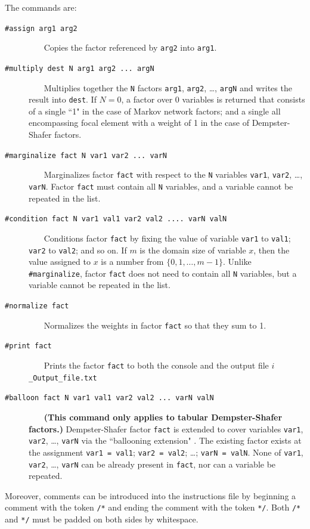 \documentclass{article}
\begin{document}
The commands are:
\begin{description}
\item[\texttt{\#assign arg1 arg2}] ~~~ Copies the factor referenced by \texttt{arg2} into \texttt{arg1}. 
\item[\texttt{\#multiply dest N arg1 arg2 ... argN}] ~~~ Multiplies together the \texttt{N} factors \texttt{arg1}, \texttt{arg2}, \dots, \texttt{argN} and writes the result into \texttt{dest}. If \(N = 0\), a factor over 0 variables is returned that consists of a single ``1" in the case of Markov network factors; and a single all encompassing focal element with a weight of 1 in the case of Dempster-Shafer factors. 
\item[\texttt{\#marginalize fact N var1 var2 ... varN}] ~~~ Marginalizes factor \texttt{fact} with respect to the \texttt{N} variables \texttt{var1}, \texttt{var2}, \dots, \texttt{varN}. Factor \texttt{fact} must contain all \texttt{N} variables, and a variable cannot be repeated in the list.
\item[\texttt{\#condition fact N var1 val1 var2 val2 .... varN valN}] ~~~ Conditions factor \texttt{fact} by fixing the value of variable \texttt{var1} to \texttt{val1}; \texttt{var2} to \texttt{val2}; and so on. If \(m\) is the domain size of variable \(x\), then the value assigned to \(x\) is a number from $\{0, 1, \dots, m-1\}$. Unlike \texttt{\#marginalize}, factor \texttt{fact} does not need to contain all \texttt{N} variables, but a variable cannot be repeated in the list.
\item[\texttt{\#normalize fact}] ~~~ Normalizes the weights in factor \texttt{fact} so that they sum to 1.
\item[\texttt{\#print fact}] ~~~ Prints the factor \texttt{fact} to both the console and the output file \texttt{$i$\_Output\_file.txt}
\item[\texttt{\#balloon fact N var1 val1 var2 val2 ... varN valN}] ~~~ \textbf{(This command only applies to tabular Dempster-Shafer factors.)} Dempster-Shafer factor \texttt{fact} is extended to cover variables \texttt{var1}, \texttt{var2}, \dots, \texttt{varN} via the ``ballooning extension" \cite{[Eastwood2015]}.  The existing factor exists at the assignment \texttt{var1 = val1}; \texttt{var2 = val2}; \dots; \texttt{varN = valN}. None of \texttt{var1}, \texttt{var2}, \dots, \texttt{varN} can be already present in \texttt{fact}, nor can a variable be repeated.
\end{description}

Moreover, comments can be introduced into the instructions file by beginning a comment with the token \texttt{/*} and ending the comment with the token \texttt{*/}. Both \texttt{/*} and \texttt{*/} must be padded on both sides by whitespace.
\end{document}
